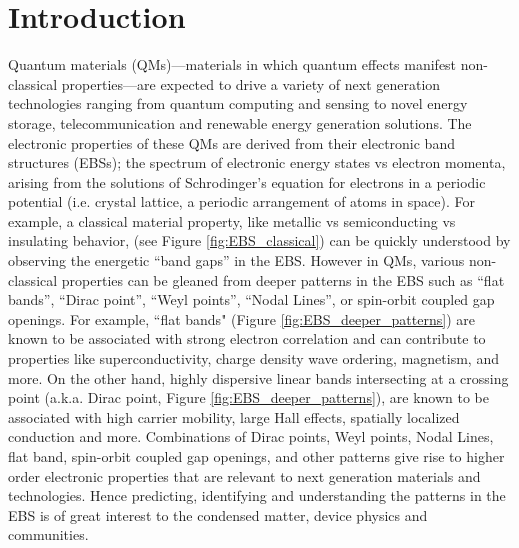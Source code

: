 \documentclass[article]{elsarticle}
\begin{document}
\nolinenumbers
\section{Introduction}
Quantum materials (QMs)---materials in which quantum effects manifest non-classical properties---are expected to drive a variety of next generation technologies ranging from quantum computing\cite{bassman2021simulating,han2018quantum,lau2020emergent} and sensing\cite{zhu2019progress,hennighausen2021twistronics,crawford2021quantum} to novel energy storage,\cite{broholm2016basic,tokura2017emergent,koo2019research,lau2020emergent} telecommunication\cite{birsan2020zr,wei2019machine,khandy2019full,grigaliunaite2020magnetic,fowley2018magnetocrystalline} and renewable energy generation solutions\cite{kamlesh2021first,kamlesh2022comprehensive,zaferani2019strategies}. The electronic properties of these QMs are derived from their electronic band structures (EBSs); the spectrum of electronic energy states vs electron momenta, arising from the solutions of Schrodinger's equation for electrons in a periodic potential (i.e. crystal lattice, a periodic arrangement of atoms in space). For example, a classical material property, like metallic vs semiconducting vs insulating behavior, (see Figure \ref{fig:EBS_classical}) can be quickly understood by observing the energetic ``band gaps'' in the EBS. However in QMs, various non-classical properties can be gleaned from deeper patterns in the EBS such as ``flat bands'', ``Dirac point'', ``Weyl points'', ``Nodal Lines'', or spin-orbit coupled gap openings. For example, ``flat bands" (Figure \ref{fig:EBS_deeper_patterns}) are known to be associated with strong electron correlation and can contribute to properties like superconductivity, charge density wave ordering, magnetism, and more\cite{balents2020superconductivity,yang2021testing,hu2021charge}. On the other hand, highly dispersive linear bands intersecting at a crossing point (a.k.a. Dirac point, Figure \ref{fig:EBS_deeper_patterns}), are known to be associated with high carrier mobility, large Hall effects, spatially localized conduction and more\cite{falson2018review,zhang2021cycling,polash2021topological,Liang2015}. Combinations of Dirac points, Weyl points, Nodal Lines, flat band, spin-orbit coupled gap openings, and other patterns give rise to higher order electronic properties that are relevant to next generation materials and technologies. Hence predicting, identifying and understanding the patterns in the EBS is of great interest to the condensed matter, device physics and communities.
\end{document}
